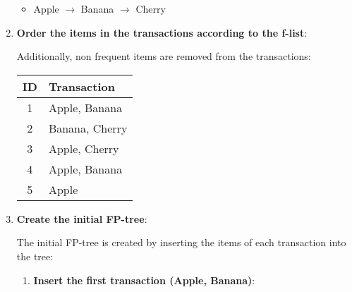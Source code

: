 \documentclass[
english,
smallborders
]{i6prcsht}
\begin{document}
\begin{solution}
\begin{enumerate}
		      \begin{itemize}
			      \item Apple $\rightarrow$ Banana $\rightarrow$ Cherry
		      \end{itemize}
		      
		\item \textbf{Order the items in the transactions according to the f-list}:
		      
		      Additionally, non frequent items are removed from the transactions:
		      
		      \begin{center}
			      \begin{tabular}{|c|l|}
				      \hline
				      \textbf{ID} & \textbf{Transaction} \\
				      \hline
				      1           & Apple, Banana        \\
				      \hline
				      2           & Banana, Cherry       \\
				      \hline
				      3           & Apple, Cherry        \\
				      \hline
				      4           & Apple, Banana        \\
				      \hline
				      5           & Apple                \\
				      \hline
			      \end{tabular}
		      \end{center}
		      
		      \newpage
		      
		\item \textbf{Create the initial FP-tree}:
		      
		      The initial FP-tree is created by inserting the items of each transaction into the tree:
		      
		      \begin{enumerate}
			      \item \textbf{Insert the first transaction (Apple, Banana)}:
			            
			            \begin{center}
\end{center}
\end{enumerate}
\end{enumerate}
\end{solution}
\end{document}
